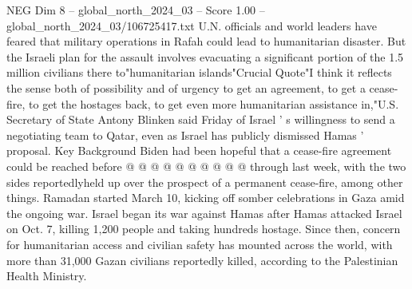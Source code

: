 \begin{textsample}{NEG Dim 8 – global\_north\_2024\_03 – Score 1.00 – global\_north\_2024\_03/106725417.txt}
U.N. officials and world leaders have feared that military operations in Rafah could lead to humanitarian disaster.
But the Israeli plan for the assault involves evacuating a significant portion of the 1.5 million civilians there to"humanitarian islands"Crucial Quote"I think it reflects the sense both of possibility and of urgency to get an agreement, to get a cease-fire, to get the hostages back, to get even more humanitarian assistance in,"U.S.
Secretary of State Antony Blinken said Friday of Israel ' s willingness to send a negotiating team to Qatar, even as Israel has publicly dismissed Hamas ' proposal.
Key Background Biden had been hopeful that a cease-fire agreement could be reached before @ @ @ @ @ @ @ @ @ @ through last week, with the two sides reportedlyheld up over the prospect of a permanent cease-fire, among other things.
Ramadan started March 10, kicking off somber celebrations in Gaza amid the ongoing war.
Israel began its war against Hamas after Hamas attacked Israel on Oct. 7, killing 1,200 people and taking hundreds hostage.
Since then, concern for humanitarian access and civilian safety has mounted across the world, with more than 31,000 Gazan civilians reportedly killed, according to the Palestinian Health Ministry.

\end{textsample}
